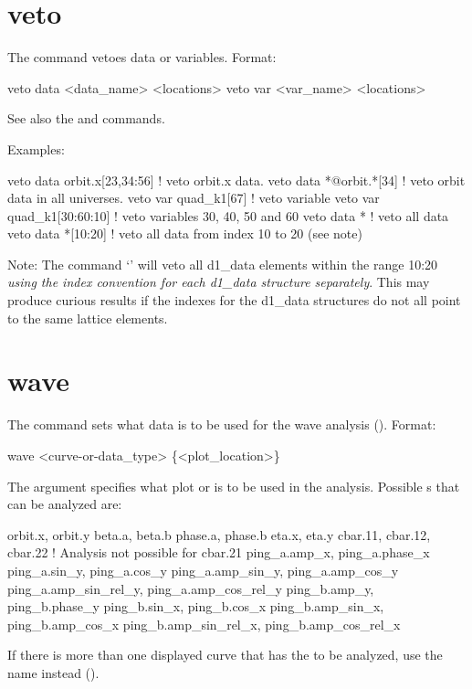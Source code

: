{{{{{{{{{%

\section{veto}
\label{s:veto}

The  command vetoes data or variables. Format:
\begin{example}
  veto data <data_name> <locations>
  veto var <var_name> <locations>
\end{example}

\vskip 7pt 

See also the  and  commands.

Examples:
\begin{example}
  veto data orbit.x[23,34:56]  ! veto orbit.x data.
  veto data *@orbit.*[34]      ! veto orbit data in all universes.
  veto var quad_k1[67]         ! veto variable
  veto var quad_k1[30:60:10]   ! veto variables 30, 40, 50 and 60
  veto data *                  ! veto all data
  veto data *[10:20]           ! veto all data from index 10 to 20 (see note)
\end{example}

Note: The command `' will veto all d1\_data elements within the range
10:20 \textit{using the index convention for each d1\_data structure separately}. This may produce
curious results if the indexes for the d1\_data structures do not all point to the same lattice
elements.


\section{wave}
\label{s:wave}

The  command sets what data is to be used for the wave analysis (). 
Format:
\begin{example}
  wave <curve-or-data_type> \{<plot_location>\}
\end{example}

\vskip 7pt

The  argument specifies what plot  or  is to be
used in the analysis. Possible s that can be analyzed are:
\begin{example}
  orbit.x, orbit.y
  beta.a,  beta.b
  phase.a, phase.b
  eta.x, eta.y
  cbar.11, cbar.12, cbar.22      ! Analysis not possible for cbar.21
  ping_a.amp_x, ping_a.phase_x
  ping_a.sin_y, ping_a.cos_y
  ping_a.amp_sin_y, ping_a.amp_cos_y
  ping_a.amp_sin_rel_y, ping_a.amp_cos_rel_y
  ping_b.amp_y, ping_b.phase_y
  ping_b.sin_x, ping_b.cos_x
  ping_b.amp_sin_x, ping_b.amp_cos_x
  ping_b.amp_sin_rel_x, ping_b.amp_cos_rel_x
\end{example}
If there is more than one displayed curve that has the  to be analyzed, use the
 name instead ().

}}}}}}}}}

